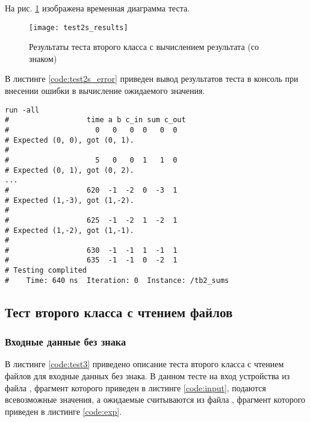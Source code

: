 На рис. \ref{fig:test2s_results} изображена временная диаграмма теста.
\vspace{-0.5cm}
\begin{figure}[H]
	\begin{center}
		\texttt{[image: test2s\_results]}
		\caption{Результаты теста второго класса с вычислением результата (со знаком)}
		\label{fig:test2s_results}
	\end{center}
\end{figure}

В листинге \ref{code:test2s_error} приведен вывод результатов теста в консоль при внесении ошибки в вычисление ожидаемого значения.	
\begin{lstlisting}[caption=Результаты ошибочного теста второго класса с вычислением результата (со знаком), label=code:test2s_error, style=console]
run -all
# 		           time a b c_in sum c_out
#                    0   0   0  0   0  0
# Expected (0, 0), got (0, 1).
# 
#                    5   0   0  1   1  0
# Expected (0, 1), got (0, 2).
...
#                  620  -1  -2  0  -3  1
# Expected (1,-3), got (1,-2).
# 
#                  625  -1  -2  1  -2  1
# Expected (1,-2), got (1,-1).
# 
#                  630  -1  -1  1  -1  1
#                  635  -1  -1  0  -2  1
# Testing complited
#    Time: 640 ns  Iteration: 0  Instance: /tb2_sums
\end{lstlisting}

\subsection{Тест второго класса с чтением файлов}

\subsubsection{Входные данные без знака}

В листинге \ref{code:test3} приведено описание теста второго класса с чтением файлов для входные данных без знака. В данном тесте на вход устройства из файла , фрагмент которого приведен в листинге \ref{code:input}, подаются всевозможные значения, а ожидаемые считываются из файла , фрагмент которого приведен в листинге \ref{code:exp}.


\newpage

\begin{multicols}{2}
		
	
\end{multicols}

